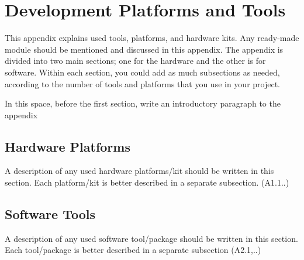 \chapter{Development Platforms and Tools}
This appendix explains used tools, platforms, and hardware kits. Any ready-made module should be mentioned and discussed in this appendix. The appendix is divided into two main sections; one for the hardware and the other is for software. Within each section, you could add as much subsections as needed, according to the number of tools and platforms that you use in your project.

In this space, before the first section, write an introductory paragraph to the appendix

\section{Hardware Platforms}
A description of any used hardware platforms/kit should be written in this section. Each platform/kit is better described in a separate subsection. (A1.1..)

\section{Software Tools }
A description of any used software tool/package should be written in this section. Each tool/package is better described in a separate subsection (A2.1,..)

